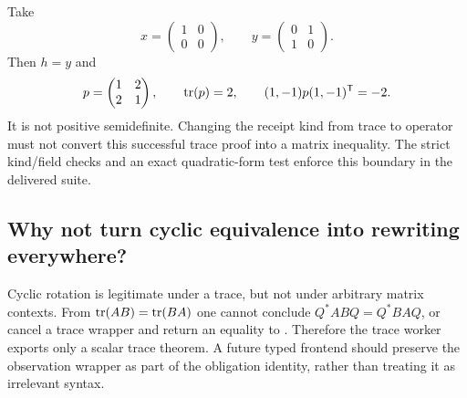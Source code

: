 Take
\[
 x=\begin{pmatrix}1&0\\0&0\end{pmatrix},\qquad
 y=\begin{pmatrix}0&1\\1&0\end{pmatrix}.
\]
Then $h=y$ and
\[
 p=\begin{pmatrix}1&2\\2&1\end{pmatrix},\qquad
 \operatorname{tr}(p)=2,\qquad (1,-1)p(1,-1)^{\mathsf T}=-2.
\]
It is not positive semidefinite. Changing the receipt kind from trace to
operator must not convert this successful trace proof into a matrix inequality.
The strict kind/field checks and an exact quadratic-form test enforce this
boundary in the delivered suite.

\subsection{Why not turn cyclic equivalence into rewriting everywhere?}

Cyclic rotation is legitimate under a trace, but not under arbitrary matrix
contexts. From $\operatorname{tr}(AB)=\operatorname{tr}(BA)$ one cannot conclude
$Q^*ABQ=Q^*BAQ$, or cancel a trace wrapper and return an equality to
. Therefore the trace worker exports only a scalar trace theorem.
A future typed frontend should preserve the observation wrapper as part of the
obligation identity, rather than treating it as irrelevant syntax.
